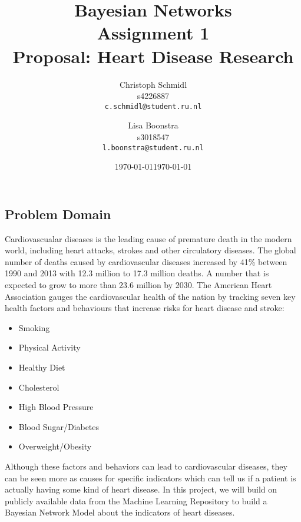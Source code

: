 \documentclass[a4paper]{article}
\title{Bayesian Networks\\Assignment 1\\Proposal: Heart Disease Research}
\author{
  Christoph Schmidl\\ s4226887\\      \texttt{c.schmidl@student.ru.nl}
  \and
  Lisa Boonstra\\ s3018547\\     \texttt{l.boonstra@student.ru.nl}
}
\date{\today}
\date{\today}
\begin{document}
\maketitle


\subsection*{Problem Domain}

Cardiovascualar diseases is the leading cause of premature death in the modern world, including heart attacks, strokes and other circulatory diseases.
The global number of deaths caused by cardiovascular diseases increased by 41\% between 1990 and 2013 with 12.3 million to 17.3 million deaths. A number that is expected to grow to more than 23.6 million by 2030.
The American Heart Association gauges the cardiovascular health of the nation by tracking seven key health factors and behaviours that increase risks for heart disease and stroke:

\vspace{1em}
\begin{varwidth}[t]{.5\textwidth}
\begin{itemize}
	\item Smoking
	\item Physical Activity
	\item Healthy Diet
\end{itemize}
\end{varwidth}%
\hspace{4em}%
\begin{varwidth}[t]{.5\textwidth}
\begin{itemize}
	\item Cholesterol
	\item High Blood Pressure
	\item Blood Sugar/Diabetes
\end{itemize}
\end{varwidth}
\hspace{4em}%
\begin{varwidth}[t]{.5\textwidth}
\begin{itemize}
	\item Overweight/Obesity
\end{itemize}
\end{varwidth}
\vspace{1em}


Although these factors and behaviors can lead to cardiovascular diseases, they can be seen more as causes for specific indicators which can tell us if a patient is actually having some kind of heart disease.
In this project, we will build on publicly available data from the Machine Learning Repository to build a Bayesian Network Model about the indicators of heart diseases.
\end{document}

